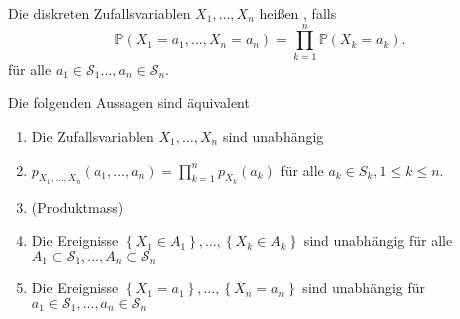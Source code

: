 \begin{definition}[Unabhängigkeit]\label{def:unabhängigkeit}
    Die diskreten Zufallsvariablen $X_1,\ldots,X_n$ heißen , falls
    \[
        \mathbb{P}(X_1=a_1,\ldots,X_n = a_n) = \prod_{k=1}^n \mathbb{P}(X_k = a_k)
    .\]
    für alle $a_1\in \mathcal{S}_1\ldots,a_n \in \mathcal{S}_n$.
\end{definition}

\begin{theorem}
    Die folgenden Aussagen sind äquivalent
    \begin{enumerate}[label=\protect\circled{\alph*}]
        \item Die Zufallsvariablen $X_1,\ldots,X_n$ sind unabhängig
        \item $p_{X_1,\ldots,X_n}(a_1,\ldots,a_n) = \prod_{k=1}^n p_{X_k}(a_k)$ für alle $a_k \in S_k, 1\leq k\leq n$.
        \item {} (Produktmass)
        \item Die Ereignisse $\left \{X_1\in A_1\right\},\ldots,\left \{X_k \in A_k\right\}  $ sind unabhängig für alle $A_1\subset \mathcal{S}_1,\ldots,A_n \subset \mathcal{S}_n$
        \item Die Ereignisse $\left \{X_1 = a_1\right\} ,\ldots,\left \{X_n = a_n\right\} $ sind unabhängig für $a_1\in \mathcal{S}_1,\ldots,a_n\in \mathcal{S}_n$
    \end{enumerate}
\end{theorem}

